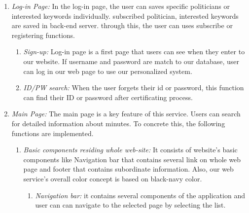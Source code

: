 \documentclass[conference]{IEEEtran}
\begin{document}
\begin{enumerate}
    \item \textit {Log-in Page:} 
In the log-in page, the user can saves specific politicians or interested keywords individually. subscribed politician, interested keywords are saved in back-end server. through this, the user can uses subscribe or registering functions.\\
    \begin{enumerate}
        \item \textit {Sign-up:}  Log-in page is a first page that users can see when they enter to our website. If username and password are match to our database, user can log in our web page to use our personalized system.\\
        \item \textit {ID/PW search:} When the user forgets their id or password, this function can find their ID or password after  certificating process.\\
    \end{enumerate}
    
    \item \textit {Main Page:}  The main page is a key feature of this service. Users can search for detailed information about minutes. To concrete this, the following functions are implemented. \\
    
      \begin{enumerate}
    \item \textit{Basic components residing whole web-site:} It consists of website's basic components like Navigation bar that contains several link on whole web page and footer that contains subordinate information. Also, our web service's overall color concept is based on black-navy color. \\
            \begin{enumerate}
    \item \textit{Navigation bar:} it contains several components of the application and user can can navigate to the selected page by selecting the list. \\
    

\end{enumerate}
\end{enumerate}
\end{enumerate}
\end{document}
